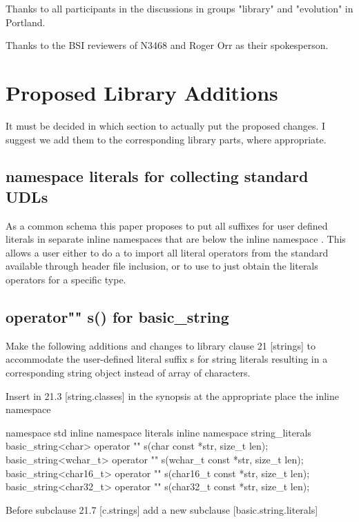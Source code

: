 \documentclass[ebook,11pt,article]{memoir}
\begin{document}
Thanks to all participants in the discussions in groups "library" and "evolution" in Portland.

Thanks to the BSI reviewers of N3468 and Roger Orr as their spokesperson.


\chapter{Proposed Library Additions}
It must be decided in which section to actually put the proposed changes. I suggest we add them to the corresponding library parts, where appropriate.
\section{namespace literals for collecting standard UDLs}
As a common schema this paper proposes to put all suffixes for user defined literals in separate inline namespaces that are below the inline namespace . 
\enternote
This allows a user either to do a  to import all literal operators from the standard available through header file inclusion, or to use  to just obtain the literals operators for a specific type.
\exitnote



\section{operator"" s() for basic_string}
Make the following additions and changes to library clause 21 [strings] to accommodate the user-defined literal suffix s for string literals resulting in a corresponding string object instead of array of characters.

Insert in 21.3 [string.classes] in the synopsis at the appropriate place the inline namespace 
\begin{codeblock}
namespace std{
inline namespace literals{
inline namespace string_literals{
basic_string<char> operator "" s(char const *str, size_t len);
basic_string<wchar_t> operator "" s(wchar_t const *str, size_t len);
basic_string<char16_t> operator "" s(char16_t const *str, size_t len);
basic_string<char32_t> operator "" s(char32_t const *str, size_t len);
}}}
\end{codeblock}

Before subclause 21.7 [c.strings] add a new subclause [basic.string.literals]
\end{document}
